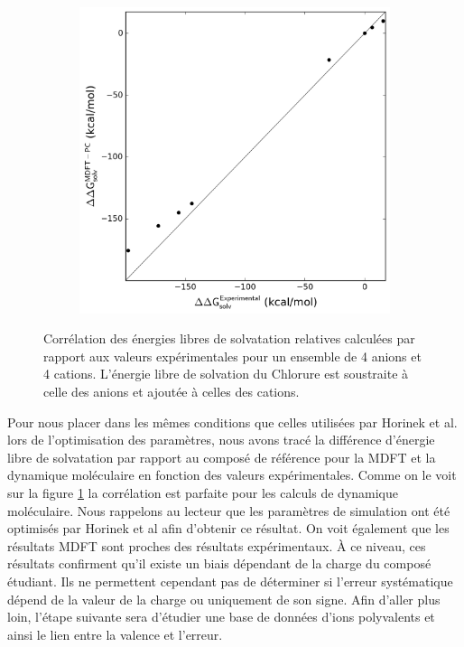 \begin{figure}[ht]
\begin{subfigure}[b]{0.49\textwidth}
{         \includegraphics[width=\textwidth]{chapters/BDD/images/ions_mmax3/correlation__delta__mdft_energy_pc__vs__expt}
}
    \end{subfigure}
  \caption[Corrélation des énergies libres de solvatation relatives calculées par rapport aux valeurs expérimentales pour les ions.]{Corrélation des énergies libres de solvatation relatives calculées par rapport aux valeurs expérimentales pour un ensemble de 4 anions et 4 cations. L'énergie libre de solvation du Chlorure est soustraite à celle des anions et ajoutée à celles des cations.}
  \label{fig:correlation_ions_delta}
\end{figure}
Pour nous placer dans les mêmes conditions que celles utilisées par Horinek et al. lors de l'optimisation des paramètres, nous avons tracé la différence d'énergie libre de solvatation par rapport au composé de référence pour la MDFT et la dynamique moléculaire en fonction des valeurs expérimentales.
Comme on le voit sur la figure \ref{fig:correlation_ions_delta} la corrélation est parfaite pour les calculs de dynamique moléculaire. Nous rappelons au lecteur que les paramètres de simulation ont été optimisés par Horinek et al afin d'obtenir ce résultat.
On voit également que les résultats MDFT sont proches des résultats expérimentaux.
À ce niveau, ces résultats confirment qu'il existe un biais dépendant de la charge du composé étudiant. Ils ne permettent cependant pas de déterminer si l'erreur systématique dépend de la valeur de la charge ou uniquement de son signe. Afin d'aller plus loin, l'étape suivante sera d'étudier une base de données d'ions polyvalents et ainsi le lien entre la valence et l'erreur.









